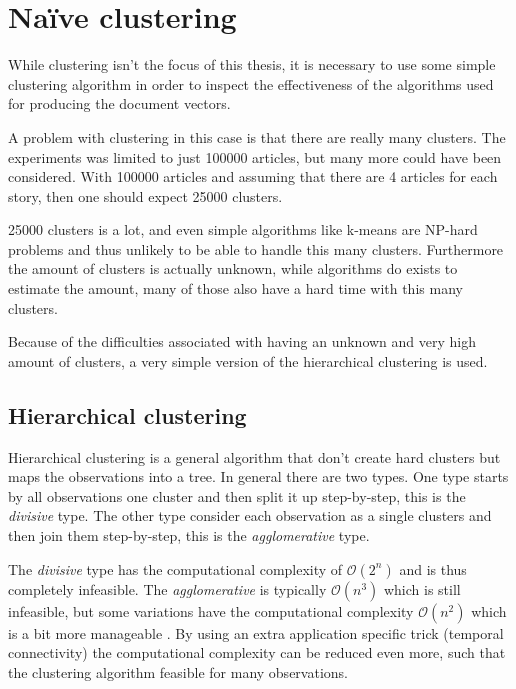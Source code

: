\section{Naïve clustering}

While clustering isn't the focus of this thesis, it is necessary to use some simple clustering algorithm in order to inspect the effectiveness of the algorithms used for producing the document vectors.

A problem with clustering in this case is that there are really many clusters. The experiments was limited to just 100000 articles, but many more could have been considered. With 100000 articles and assuming that there are 4 articles for each story, then one should expect 25000 clusters.

25000 clusters is a lot, and even simple algorithms like k-means are NP-hard problems and thus unlikely to be able to handle this many clusters. Furthermore the amount of clusters is actually unknown, while algorithms do exists to estimate the amount, many of those also have a hard time with this many clusters.

Because of the difficulties associated with having an unknown and very high amount of clusters, a very simple version of the hierarchical clustering is used.

\subsection{Hierarchical clustering}

Hierarchical clustering is a general algorithm that don't create hard clusters but maps the observations into a tree. In general there are two types. One type starts by all observations one cluster and then split it up step-by-step, this is the \textit{divisive} type. The other type consider each observation as a single clusters and then join them step-by-step, this is the \textit{agglomerative} type.

The \textit{divisive} type has the computational complexity of $\mathcal{O}(2^n)$ and is thus completely infeasible. The \textit{agglomerative} is typically $\mathcal{O}(n^3)$ which is still infeasible, but some variations have the computational complexity $\mathcal{O}(n^2)$ which is a bit more manageable \cite{wiki-hcluster}. By using an extra application specific trick (temporal connectivity) the computational complexity can be reduced even more, such that the clustering algorithm feasible for many observations.

